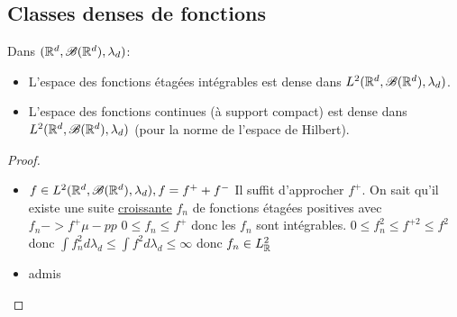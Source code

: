 \subsection{Classes denses de fonctions}

\begin{theorem}
	Dans $(\mathbb{R}^d, \mathscr{B} (\mathbb{R}^d), \lambda_d)$:

	\begin{itemize}
		\item L'espace des fonctions étagées intégrables est dense dans $L^2(\mathbb{R}^d, \mathscr{B} (\mathbb{R}^d), \lambda_d)$.
		\item L'espace des fonctions continues (à support compact) est dense dans $L^2(\mathbb{R}^d, \mathscr{B} (\mathbb{R}^d), \lambda_d)$ (pour la norme de l'espace de Hilbert).
	\end{itemize}
\end{theorem}

\begin{proof}
	\begin{itemize}
		\item $ f \in L^2(\mathbb{R}^d, \mathscr{B} (\mathbb{R}^d), \lambda_d), f = f^+ + f^-$
		Il suffit d'approcher $f^+$. On sait qu'il existe une suite \underline{croissante} $f_n$ de fonctions étagées positives avec $f_n -> f^+ \mu-pp$ %
		$0 \leq f_n \leq f^+$ donc les $f_n$ sont intégrables.
		$0\leq f_n^2 \leq f^{+2} \leq f^2$ donc $\int f_n^2 d \lambda_d \leq \int f^2d \lambda_d \le \infty$ donc $f_n \in L^2_{\mathbb{R}}$
		\item admis
	\end{itemize}
\end{proof}




